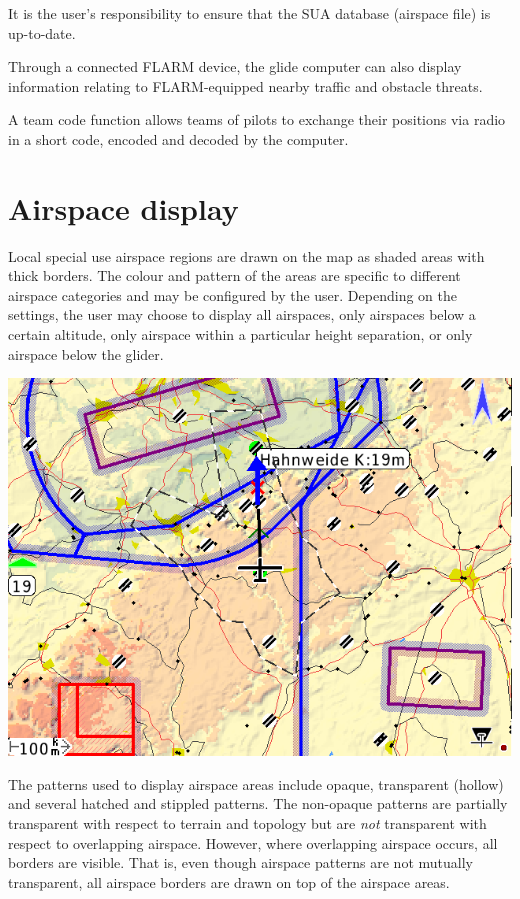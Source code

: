 \documentclass[a4paper,12pt]{refrep}
\begin{document}
It is the user's responsibility to ensure that the SUA database
(airspace file) is up-to-date.

Through a connected FLARM device, the glide computer can also
display information relating to FLARM-equipped nearby traffic
and obstacle threats.

A team code function allows teams of pilots to exchange their
positions via radio in a short code, encoded and decoded by the
computer.

\section{Airspace display}

Local special use airspace regions are drawn on the map as shaded
areas with thick borders.  The colour and pattern of the areas are
specific to different airspace categories and may be configured by the
user.  Depending on the settings, the user may choose to display all
airspaces, only airspaces below a certain altitude, only airspace within a
particular height separation, or only airspace below the glider.

\begin{center}
\includegraphics[angle=0,width=\linewidth,keepaspectratio='true']{figures/airspace.png}
\end{center}

The patterns used to display airspace areas include opaque,
transparent (hollow) and several hatched and stippled patterns.  The
non-opaque patterns are partially transparent with respect to terrain
and topology but are {\em not} transparent with respect to overlapping
airspace.  However, where overlapping airspace occurs, all borders are
visible.  That is, even though airspace patterns are not mutually
transparent, all airspace borders are drawn on top of the airspace
areas.
\end{document}
